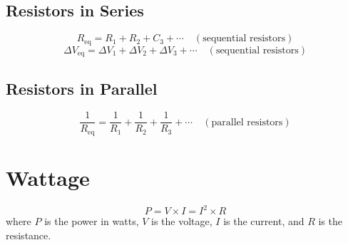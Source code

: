 \documentclass{article}
\begin{document}
\subsection*{Resistors in Series}

\[R_\text{eq}=R_1 + R_2 + C_3 + \cdots\quad (\text{sequential resistors})\]
\[\Delta V_\text{eq}=\Delta V_1 + \Delta V_2 + \Delta V_3 + \cdots\quad (\text{sequential resistors})\]

\subsection*{Resistors in Parallel}

\[\frac{1}{R_\text{eq}}=\frac{1}{R_1} + \frac{1}{R_2} + \frac{1}{R_3} + \cdots\quad (\text{parallel resistors})\]

\section*{Wattage}
\[P=V\times I=I^2 \times R\] where $P$ is the power in watts, $V$ is the voltage, $I$ is the current, and $R$ is the resistance.
\end{document}

